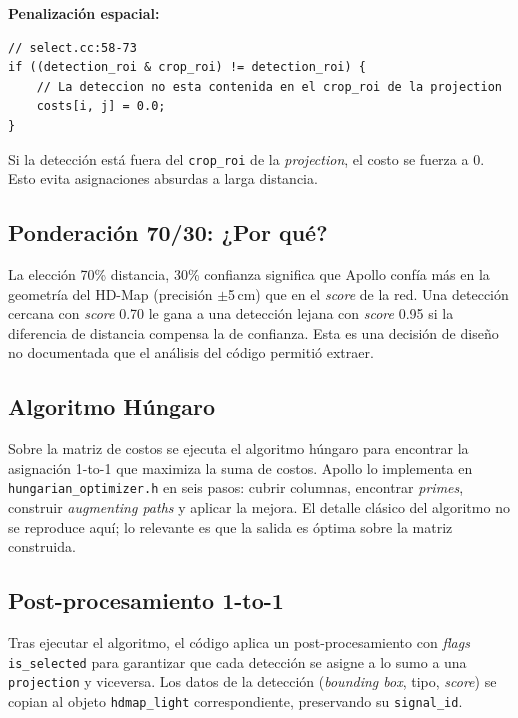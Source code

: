 \textbf{Penalización espacial:}

\begin{codesnippet}
\begin{verbatim}
// select.cc:58-73
if ((detection_roi & crop_roi) != detection_roi) {
    // La deteccion no esta contenida en el crop_roi de la projection
    costs[i, j] = 0.0;
}
\end{verbatim}
\end{codesnippet}

Si la detección está fuera del \texttt{crop\_roi} de la \textit{projection}, el costo se fuerza a 0. Esto evita asignaciones absurdas a larga distancia.

\subsection{Ponderación 70/30: ¿Por qué?}

La elección 70\% distancia, 30\% confianza significa que Apollo confía más en la geometría del HD-Map (precisión $\pm$5\,cm) que en el \textit{score} de la red. Una detección cercana con \textit{score} 0.70 le gana a una detección lejana con \textit{score} 0.95 si la diferencia de distancia compensa la de confianza. Esta es una decisión de diseño no documentada que el análisis del código permitió extraer.

\subsection{Algoritmo Húngaro}

Sobre la matriz de costos se ejecuta el algoritmo húngaro para encontrar la asignación 1-to-1 que maximiza la suma de costos. Apollo lo implementa en \texttt{hungarian\_optimizer.h} en seis pasos: cubrir columnas, encontrar \textit{primes}, construir \textit{augmenting paths} y aplicar la mejora. El detalle clásico del algoritmo no se reproduce aquí; lo relevante es que la salida es óptima sobre la matriz construida.

\subsection{Post-procesamiento 1-to-1}

Tras ejecutar el algoritmo, el código aplica un post-procesamiento con \textit{flags} \texttt{is\_selected} para garantizar que cada detección se asigne a lo sumo a una \texttt{projection} y viceversa. Los datos de la detección (\textit{bounding box}, tipo, \textit{score}) se copian al objeto \texttt{hdmap\_light} correspondiente, preservando su \texttt{signal\_id}.

